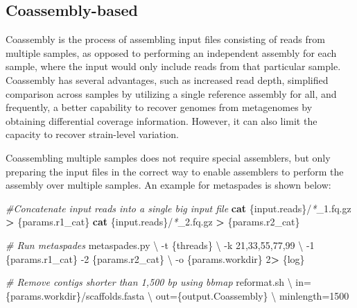 \documentclass[
]{book}
\newenvironment{Shaded}{\begin{snugshade}}{\end{snugshade}}
\newcommand{\AttributeTok}[1]{\textcolor[rgb]{0.13,0.29,0.53}{#1}}
\newcommand{\CommentTok}[1]{\textcolor[rgb]{0.56,0.35,0.01}{\textit{#1}}}
\newcommand{\DataTypeTok}[1]{\textcolor[rgb]{0.13,0.29,0.53}{#1}}
\newcommand{\DecValTok}[1]{\textcolor[rgb]{0.00,0.00,0.81}{#1}}
\newcommand{\ExtensionTok}[1]{#1}
\newcommand{\FunctionTok}[1]{\textcolor[rgb]{0.13,0.29,0.53}{\textbf{#1}}}
\newcommand{\NormalTok}[1]{#1}
\newcommand{\OperatorTok}[1]{\textcolor[rgb]{0.81,0.36,0.00}{\textbf{#1}}}
\newcommand{\PreprocessorTok}[1]{\textcolor[rgb]{0.56,0.35,0.01}{\textit{#1}}}
\begin{document}
\normalsize

\hypertarget{coassembly-based}{%
\subsection*{Coassembly-based}\label{coassembly-based}}

Coassembly is the process of assembling input files consisting of reads from multiple samples, as opposed to performing an independent assembly for each sample, where the input would only include reads from that particular sample. Coassembly has several advantages, such as increased read depth, simplified comparison across samples by utilizing a single reference assembly for all, and frequently, a better capability to recover genomes from metagenomes by obtaining differential coverage information. However, it can also limit the capacity to recover strain-level variation.

Coassembling multiple samples does not require special assemblers, but only preparing the input files in the correct way to enable assemblers to perform the assembly over multiple samples. An example for metaspades is shown below:

\small

\begin{Shaded}
\begin{Highlighting}[]
\CommentTok{\#Concatenate input reads into a single big input file}
\FunctionTok{cat}\NormalTok{ \{input.reads\}/}\PreprocessorTok{*}\NormalTok{\_1.fq.gz }\OperatorTok{\textgreater{}}\NormalTok{ \{params.r1\_cat\}}
\FunctionTok{cat}\NormalTok{ \{input.reads\}/}\PreprocessorTok{*}\NormalTok{\_2.fq.gz }\OperatorTok{\textgreater{}}\NormalTok{ \{params.r2\_cat\}}

\CommentTok{\# Run metaspades}
\ExtensionTok{metaspades.py} \DataTypeTok{\textbackslash{}}
    \AttributeTok{{-}t}\NormalTok{ \{threads\} }\DataTypeTok{\textbackslash{}}
    \AttributeTok{{-}k}\NormalTok{ 21,33,55,77,99 }\DataTypeTok{\textbackslash{}}
    \AttributeTok{{-}1}\NormalTok{ \{params.r1\_cat\} }\AttributeTok{{-}2}\NormalTok{ \{params.r2\_cat\} }\DataTypeTok{\textbackslash{}}
    \AttributeTok{{-}o}\NormalTok{ \{params.workdir\}}
    \DecValTok{2}\OperatorTok{\textgreater{}}\NormalTok{ \{log\}}

\CommentTok{\# Remove contigs shorter than 1,500 bp using bbmap}
\ExtensionTok{reformat.sh} \DataTypeTok{\textbackslash{}}
\NormalTok{    in=\{params.workdir\}/scaffolds.fasta }\DataTypeTok{\textbackslash{}}
\NormalTok{    out=\{output.Coassembly\} }\DataTypeTok{\textbackslash{}}
\NormalTok{    minlength=1500}
\end{Highlighting}
\end{Shaded}
\end{document}
